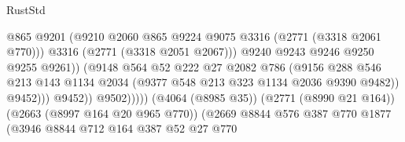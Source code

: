 \begin{lexlean}{RustStd}
\begin{coremodule}
                                                  @865
                                                  @9201
                                                  (@9210
                                                    @2060
                                                    @865
                                                    @9224
                                                    @9075
                                                    @3316
                                                    (@2771 (@3318 @2061 @770)))
                                                  @3316
                                                  (@2771 (@3318 @2051 @2067)))
                                                @9240
                                                @9243
                                                @9246
                                                @9250
                                                @9255
                                                @9261))
                                            (@9148
                                              @564
                                              @52
                                              @222
                                              @27
                                              @2082
                                              @786
                                              (@9156
                                                @288
                                                @546
                                                @213
                                                @143
                                                @1134
                                                @2034
                                                (@9377 @548 @213 @323 @1134 @2036 @9390 @9482))
                                              @9452)))
                                        @9452))
                                    @9502)))))
                          (@4064 (@8985 @35))
                          (@2771 (@8990 @21 @164))
                          (@2663 (@8997 @164 @20 @965 @770))
                          (@2669
                            @8844
                            @576
                            @387
                            @770
                            @1877
                            (@3946
                              @8844
                              @712
                              @164
                              @387
                              @52
                              @27
                              @770

\end{coremodule}
\end{lexlean}
